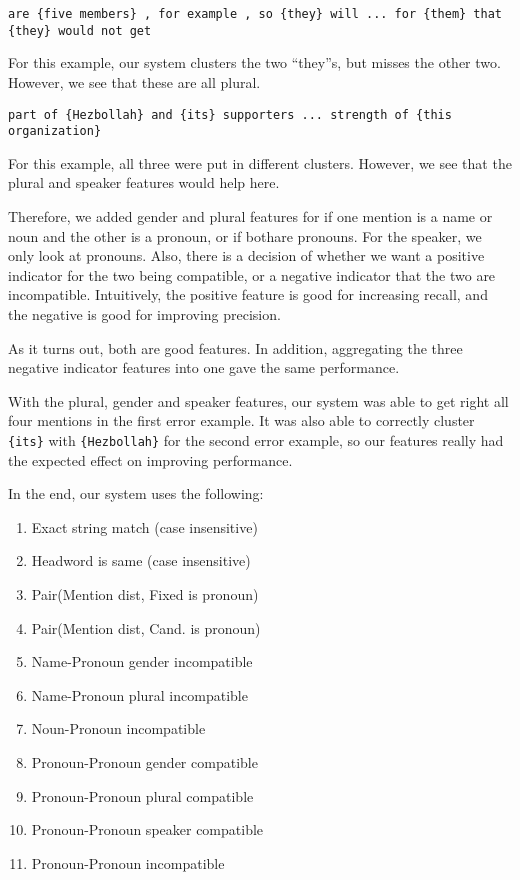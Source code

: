 \documentclass[12pt, twocolumn]{article}
\begin{document}
\texttt{are \{{five members\}} , for example , so \{{they\}} will ... for \{{them\}} that \{{they\}} would not get}

For this example, our system clusters the two ``they''s, but misses the other two. However, we see that these are all plural.

\texttt{part of {\{Hezbollah\}} and {\{its}\} supporters ... strength of \{{this organization}\}}

For this example, all three were put in different clusters. However, we see that the plural and speaker features would help here.

Therefore, we added gender and plural features for if one mention is a name or noun and the other is a pronoun, or if bothare pronouns. For the speaker, we only look at pronouns. Also, there is a decision of whether we want a positive indicator for the two being compatible, or a negative indicator that the two are incompatible. Intuitively, the positive feature is good for increasing recall, and the negative is good for improving precision.

As it turns out, both are good features. In addition, aggregating the three negative indicator features into one gave the same performance.

With the plural, gender and speaker features, our system was able to get right all four mentions in the first error example.
It was also able to correctly cluster \texttt{\{its\}} with \texttt{\{Hezbollah\}} for the second error example, so our features really had the expected effect on improving performance.

In the end, our system uses the following:
\begin{enumerate}[(1)]
\item Exact string match (case insensitive)
\item Headword is same (case insensitive)
\item Pair(Mention dist, Fixed is pronoun) 
\item Pair(Mention dist, Cand. is pronoun) 
\item Name-Pronoun gender incompatible
\item Name-Pronoun plural incompatible
\item Noun-Pronoun incompatible
\item Pronoun-Pronoun gender compatible
\item Pronoun-Pronoun plural compatible
\item Pronoun-Pronoun speaker compatible
\item Pronoun-Pronoun incompatible
\end{enumerate}
\end{document}
